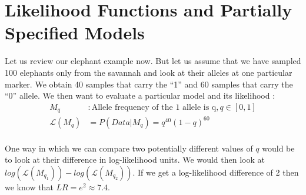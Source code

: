 \documentclass[12pt]{report}
\begin{document}
\section{Likelihood Functions and Partially Specified Models}

Let us review our elephant example now. But let us assume that we have sampled 100 elephants only from the savannah and look at their alleles at one particular marker. We obtain 40 samples that carry the ``1'' and 60 samples that carry the ``0'' allele. We then want to evaluate a particular model and its likelihood : 
\begin{align*}
M_q &: \text{Allele frequency of the 1 allele is q}, q \in[0,1]\\
\mathcal{L}(M_q) &= P(Data | M_q) = q^{40}(1-q)^{60}\\
\end{align*}

One way in which we can compare two potentially different values of $q$ would be to look at their difference in log-likelihood units. We would then look at $log(\mathcal{L}(M_{q_1})) - log(\mathcal{L}(M_{q_2}))$. If we get a log-likelihood difference of 2 then we know that $LR = e^2 \approx 7.4$.  
\end{document}
